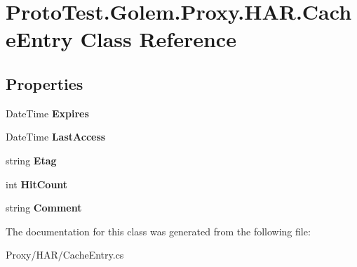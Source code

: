 \hypertarget{class_proto_test_1_1_golem_1_1_proxy_1_1_h_a_r_1_1_cache_entry}{\section{Proto\-Test.\-Golem.\-Proxy.\-H\-A\-R.\-Cache\-Entry Class Reference}
\label{class_proto_test_1_1_golem_1_1_proxy_1_1_h_a_r_1_1_cache_entry}
}
\subsection*{Properties}
\begin{DoxyCompactItemize}
\item 
\hypertarget{class_proto_test_1_1_golem_1_1_proxy_1_1_h_a_r_1_1_cache_entry_ae564b3b55f00790df529f609145e7253}{Date\-Time {\bfseries Expires}}\label{class_proto_test_1_1_golem_1_1_proxy_1_1_h_a_r_1_1_cache_entry_ae564b3b55f00790df529f609145e7253}

\item 
\hypertarget{class_proto_test_1_1_golem_1_1_proxy_1_1_h_a_r_1_1_cache_entry_ad5eb0b5d65b37a24ec8d5a48f624d114}{Date\-Time {\bfseries Last\-Access}}\label{class_proto_test_1_1_golem_1_1_proxy_1_1_h_a_r_1_1_cache_entry_ad5eb0b5d65b37a24ec8d5a48f624d114}

\item 
\hypertarget{class_proto_test_1_1_golem_1_1_proxy_1_1_h_a_r_1_1_cache_entry_a9942f7ddc57be0455ca3c59eff90cb7a}{string {\bfseries Etag}}\label{class_proto_test_1_1_golem_1_1_proxy_1_1_h_a_r_1_1_cache_entry_a9942f7ddc57be0455ca3c59eff90cb7a}

\item 
\hypertarget{class_proto_test_1_1_golem_1_1_proxy_1_1_h_a_r_1_1_cache_entry_a182b99b0493f5375d08f33ceb4a43e09}{int {\bfseries Hit\-Count}}\label{class_proto_test_1_1_golem_1_1_proxy_1_1_h_a_r_1_1_cache_entry_a182b99b0493f5375d08f33ceb4a43e09}

\item 
\hypertarget{class_proto_test_1_1_golem_1_1_proxy_1_1_h_a_r_1_1_cache_entry_a21f0bbf8d03ee65b40ee1076a9c4c4c6}{string {\bfseries Comment}}\label{class_proto_test_1_1_golem_1_1_proxy_1_1_h_a_r_1_1_cache_entry_a21f0bbf8d03ee65b40ee1076a9c4c4c6}

\end{DoxyCompactItemize}


The documentation for this class was generated from the following file\-:\begin{DoxyCompactItemize}
\item 
Proxy/\-H\-A\-R/Cache\-Entry.\-cs\end{DoxyCompactItemize}

